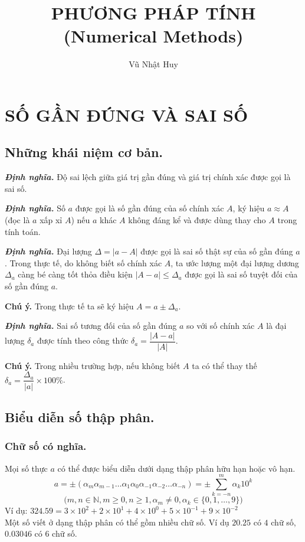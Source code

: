 \documentclass[12pt, a4paper]{report}
\title{PHƯƠNG PHÁP TÍNH (Numerical Methods)}
\author{Vũ Nhật Huy}
\def\DN{\textbf{\textit{Định nghĩa. }}}
\begin{document}
\onehalfspacing
\maketitle
\newpage
\tableofcontents
\newpage
\chapter{SỐ GẦN ĐÚNG VÀ SAI SỐ}
\section{Những khái niệm cơ bản.}
\DN Độ sai lệch giữa giá trị gần đúng và giá trị chính xác được gọi là sai số.

\DN Số $a$ được gọi là số gần đúng của số chính xác $A$, ký hiệu $a \approx A$ (đọc là $a$ xấp xỉ $A$) nếu $a$ khác $A$ không đáng kể và được dùng thay cho $A$ trong tính toán.

\DN Đại lượng $\Delta = |a - A|$ được gọi là sai số thật sự của số gần đúng $a$. Trong thực tế, do không biết số chính xác $A$, ta ước lượng một đại lượng dương $\Delta_a$ càng bé càng tốt thỏa điều kiện $|A-a|\leq \Delta_a$ được gọi là sai số tuyệt đối của số gần đúng $a$.

\textbf{Chú ý.} Trong thực tế ta sẽ ký hiệu $A = a \pm \Delta_a$.

\DN Sai số tương đối của số gần đúng $a$ so với số chính xác $A$ là đại lượng $\delta_a$ được tính theo công thức $\delta_a = \dfrac{|A-a|}{|A|}$.

\textbf{Chú ý.} Trong nhiều trường hợp, nếu không biết $A$ ta có thể thay thế $\delta_a = \dfrac{\Delta_a}{|a|}\times 100\%$.
\section{Biểu diễn số thập phân.}
\subsection{Chữ số có nghĩa.}
Mọi số thực $a$ có thể được biểu diễn dưới dạng thập phân hữu hạn hoặc vô hạn. 
\[
    a = \pm (\alpha_m \alpha_{m-1}\ldots \alpha_1 \alpha_0 \alpha_{-1} \alpha_{-2}\ldots \alpha_{-n}) = \pm \sum_{k = -n}^{m} \alpha_k 10^k
\]
\[
    \big( m,n \in \mathbb{N},m\geq 0,n\geq 1,\alpha_m \neq 0, \alpha_k \in \{0,1,\ldots,9\} \big)
\]
Ví dụ: $324.59 = 3\times 10^2 + 2\times 10^1 + 4\times 10^0 + 5\times 10^{-1} + 9\times 10^{-2}$\\
Một số viết ở dạng thập phân có thể gồm nhiều chữ số. Ví dụ $20.25$ có $4$ chữ số, $0.03046$ có $6$ chữ số.
\end{document}
